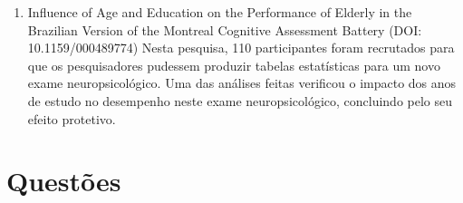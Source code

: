 \documentclass[
]{book}
\providecommand{\tightlist}{%
  \setlength{\itemsep}{0pt}\setlength{\parskip}{0pt}}
\begin{document}
\begin{enumerate}
\def\labelenumi{\arabic{enumi}.}
\tightlist
\item
  Influence of Age and Education on the Performance of Elderly in the Brazilian Version of the Montreal Cognitive Assessment Battery (DOI: 10.1159/000489774)
  Nesta pesquisa, 110 participantes foram recrutados para que os pesquisadores pudessem produzir tabelas estatísticas para um novo exame neuropsicológico. Uma das análises feitas verificou o impacto dos anos de estudo no desempenho neste exame neuropsicológico, concluindo pelo seu efeito protetivo.
\end{enumerate}

\hypertarget{questuxf5es-5}{%
\section{Questões}\label{questuxf5es-5}}
\end{document}
